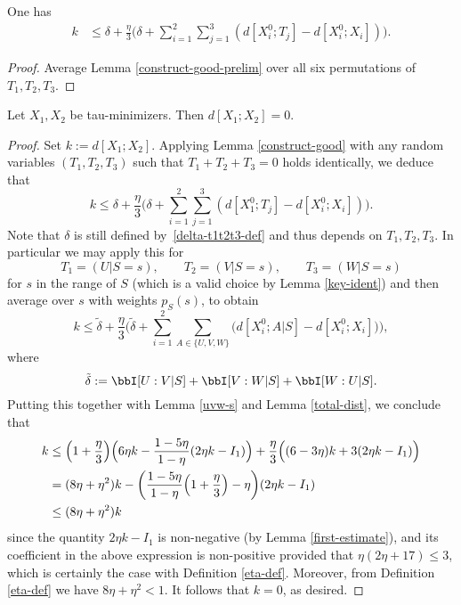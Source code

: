 \begin{lemma}\label{construct-good}
  \leanok
One has
\begin{align*}  k & \leq  \delta + \frac{\eta}{3} \biggl( \delta + \sum_{i=1}^2 \sum_{j = 1}^3 (d[X^0_i;T_j] - d[X^0_i; X_i]) \biggr).
  \end{align*}
\end{lemma}

\begin{proof}
\leanok
Average Lemma \ref{construct-good-prelim} over all six permutations of $T_1,T_2,T_3$.
\end{proof}




\begin{theorem}\label{de-prop}
  \leanok
  Let $X_1, X_2$ be tau-minimizers.  Then $d[X_1;X_2] = 0$.
\end{theorem}

\begin{proof}
  \leanok
  Set $k := d[X_1;X_2]$.  Applying Lemma \ref{construct-good} with any random variables $(T_1,T_2,T_3)$ such that $T_1+T_2+T_3=0$ holds identically, we deduce that
\[
  k \leq \delta + \frac{\eta}{3} \biggl( \delta + \sum_{i=1}^2 \sum_{j = 1}^3 (d[X^0_1;T_j] - d[X^0_i;X_i]) \biggr).
\]
Note that $\delta$ is still defined by~\eqref{delta-t1t2t3-def} and thus depends on $T_1,T_2,T_3$.
In particular we may apply this for
\[
  T_1 = (U | S = s),\qquad T_2 = (V | S = s), \qquad T_3 = (W | S = s)
\]
for $s$ in the range of $S$ (which is a valid choice by Lemma \ref{key-ident}) and then average over $s$ with weights $p_S(s)$, to obtain
\[k \leq \tilde \delta + \frac{\eta}{3} \biggl( \tilde \delta + \sum_{i=1}^2 \sum_{A\in\{U,V,W\}} \bigl(  d[X^0_i;A|S] - d[X^0_i;X_i]\bigr) \biggr),\]
where
\[
  \tilde \delta :=  \bbI[U : V | S] + \bbI[V : W | S] + \bbI[W : U | S].
\]
Putting this together with Lemma \ref{uvw-s} and Lemma \ref{total-dist}, we conclude that
\begin{align*}
  k &\leq \Bigl(1+\frac{\eta}{3}\Bigr)\Bigl(6\eta k-\frac{1-5\eta}{1-\eta}(2\eta k-I_1)\Bigr)+\frac{\eta}{3}\Bigl((6-3\eta)k+3(2\eta k-I_1)\Bigr)\\
  &= (8\eta + \eta^2) k - \biggl( \frac{1 - 5 \eta}{1-\eta}\Bigl(1 + \frac{\eta}{3}\Bigr) -  \eta \biggr)(2 \eta k - I_1)\\
  &\leq (8 \eta + \eta^2) k
 \end{align*}
since the quantity $2 \eta k - I_1$ is non-negative (by Lemma \ref{first-estimate}), and its coefficient in the above expression is non-positive provided that $\eta(2\eta + 17) \le 3$, which is certainly the case with Definition \ref{eta-def}.
Moreover, from Definition \ref{eta-def} we have $8 \eta + \eta^2 < 1$. It follows that $k=0$, as desired.
\end{proof}


